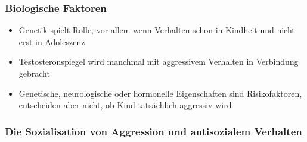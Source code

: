 \subsubsection{Biologische Faktoren}
\begin{itemize}
	\item
		Genetik spielt Rolle, vor allem wenn Verhalten schon in Kindheit und nicht erst in Adoleszenz
	\item
		Testosteronspiegel wird manchmal mit aggressivem Verhalten in Verbindung gebracht
	\item
		Genetische, neurologische oder hormonelle Eigenschaften sind Risikofaktoren, entscheiden aber nicht, ob Kind tatsächlich aggressiv wird
\end{itemize}

\subsubsection{Die Sozialisation von Aggression und antisozialem Verhalten}
